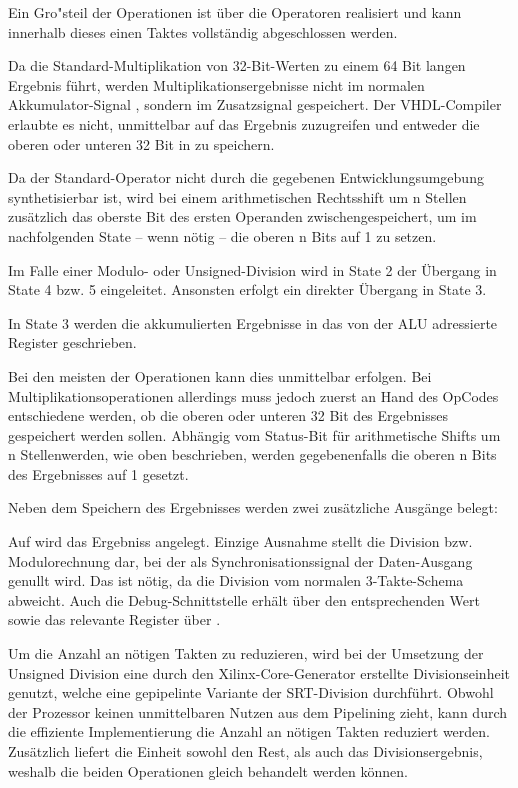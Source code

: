 Ein Gro"steil der Operationen ist \"uber die  Operatoren realisiert und kann innerhalb dieses einen Taktes vollständig abgeschlossen werden.

Da die Standard-Multiplikation von 32-Bit-Werten zu einem 64 Bit langen Ergebnis f\"uhrt, werden Multiplikationsergebnisse nicht im normalen Akkumulator-Signal , sondern im Zusatzsignal  gespeichert. Der VHDL-Compiler erlaubte es nicht, unmittelbar auf das Ergebnis zuzugreifen und entweder die oberen oder unteren 32 Bit in  zu speichern.\vspace{10pt}

Da der Standard-Operator  nicht durch die gegebenen Entwicklungsumgebung synthetisierbar ist, wird bei einem arithmetischen Rechtsshift um {n} Stellen zus\"atzlich das oberste Bit des ersten Operanden zwischengespeichert, um im nachfolgenden State – wenn n\"otig – die oberen {n} Bits auf {1} zu setzen.\vspace{10pt}

Im Falle einer Modulo- oder Unsigned-Division wird in State 2 der \"Ubergang in State 4 bzw. 5 eingeleitet. Ansonsten erfolgt ein direkter \"Ubergang in State 3.

In State 3 werden die akkumulierten Ergebnisse in das von der ALU adressierte Register geschrieben.

Bei den meisten der Operationen kann dies unmittelbar erfolgen. Bei Multiplikationsoperationen allerdings muss jedoch zuerst an Hand des OpCodes entschiedene werden, ob die oberen oder unteren 32 Bit des Ergebnisses gespeichert werden sollen. Abh\"angig vom Status-Bit f\"ur arithmetische Shifts um {n} Stellenwerden, wie oben beschrieben, werden gegebenenfalls die oberen n Bits des Ergebnisses auf {1} gesetzt.\vspace{10pt}


Neben dem Speichern des Ergebnisses werden zwei zus\"atzliche Ausg\"ange belegt:

Auf  wird das Ergebniss angelegt. Einzige Ausnahme stellt die Division bzw. Modulorechnung dar, bei der als Synchronisationssignal der Daten-Ausgang genullt wird. Das ist n\"otig, da die Division vom normalen 3-Takte-Schema abweicht.
Auch die Debug-Schnittstelle erh\"alt \"uber  den entsprechenden Wert sowie das relevante Register \"uber .

Um die Anzahl an n\"otigen Takten zu reduzieren, wird bei der Umsetzung der Unsigned Division eine durch den Xilinx-Core-Generator erstellte Divisionseinheit genutzt, welche eine gepipelinte Variante der SRT-Division durchf\"uhrt. Obwohl der Prozessor keinen unmittelbaren Nutzen aus dem Pipelining zieht, kann durch die effiziente Implementierung die Anzahl an n\"otigen Takten reduziert werden. Zus\"atzlich liefert die Einheit sowohl den Rest, als auch das Divisionsergebnis, weshalb die beiden Operationen gleich behandelt werden k\"onnen.


